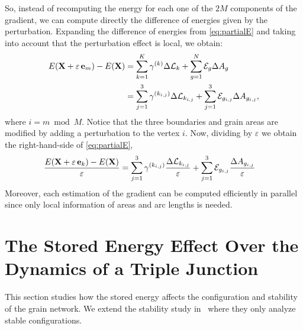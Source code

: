 So, instead of recomputing the energy for each one of the $2M$ components of the gradient, we can compute directly the
difference of energies given by the perturbation.
Expanding the difference of energies from \eqref{eq:partialE} and taking into account that the perturbation effect is local, we obtain:
\begin{align*}
    E(\X+\varepsilon\,  \ei{m}) - E(\X) &=  
    \sum_{k =1}^K \gamma^{(k)}\Delta{\AL}_{k} + 
     \sum_{g=1}^N \SE_{g}\Delta{A}_{g}\\
    &= \sum_{j=1}^3 \gamma^{(k_{i,j})} \Delta \AL_{k_{i,j}} + \sum_{j=1}^3 \SE_{g_{i,j}} \Delta A_{g_{i,j}},
\end{align*}
where $i=m \bmod M$.  Notice that the three boundaries and grain areas are modified by adding a perturbation to the vertex $i$. Now, dividing by $\varepsilon$ we obtain the right-hand-side of \eqref{eq:partialE}, \begin{align*}
    \dfrac{E(\X+\varepsilon\,  \ei{k}) - E(\X)}{\varepsilon} &=  
    \sum_{j =1}^3 \gamma^{(k_{i,j})} \dfrac{\Delta{\AL}_{k_{i,j}}}{\varepsilon}
     +\sum_{j=1}^3 \SE_{g_{i,j}}\dfrac{\Delta{A}_{g_{i,j}}}{\varepsilon}
\end{align*}
%
Moreover, each estimation of the gradient can be computed efficiently in parallel since only local information of areas and arc lengths is needed.

\section{The Stored Energy Effect Over the Dynamics of a Triple Junction}
\label{sec:dynamics} 
 
This section studies how the stored energy %
affects the configuration and stability of the grain network.
We extend the stability study in~\cite{Bernacki2011} where they only analyze stable configurations.

